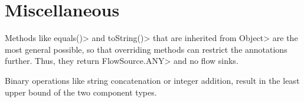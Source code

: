\section{Miscellaneous}

Methods like \<equals()> and \<toString()> that are inherited from
\<Object> are the most general possible, so that overriding methods
can restrict the annotations further. Thus, they
return \<FlowSource.ANY> and no flow sinks.

Binary operations like string concatenation or integer addition,
result in the least upper bound of the two component types.





